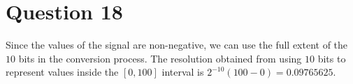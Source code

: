 \section{Question 18}

Since the values of the signal are non-negative, we can use the full extent of
the $10$ bits in the conversion process. The resolution obtained from using $10$
bits to represent values inside the $[0,100]$ interval is $2^{-10} (100 - 0) = 0.09765625$.

